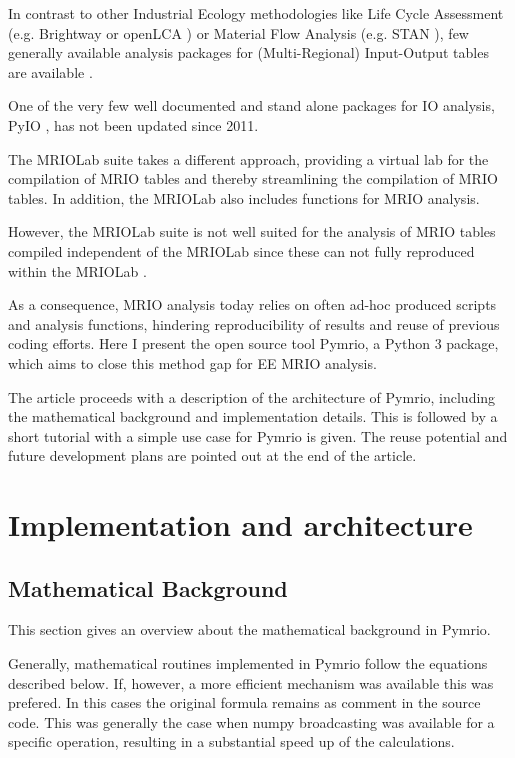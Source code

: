 \documentclass{jors}
\begin{document}
{In contrast to other Industrial Ecology methodologies like 
Life Cycle Assessment (e.g. Brightway \cite{mutel2017} or openLCA \cite{openlca2018})
or Material Flow Analysis (e.g. STAN \cite{cencic2008}), 
few generally available analysis packages for (Multi-Regional) Input-Output tables are available \cite{pauliuk2015}.  

One of the very few well documented and stand alone packages for IO analysis, PyIO \cite{nazara2003}, has not been updated since 2011.

The MRIOLab suite \cite{geschke2017,lenzen2017} takes a different approach, providing a virtual lab for the compilation of MRIO tables and thereby streamlining the compilation of MRIO tables. In addition, the MRIOLab also includes functions for MRIO analysis.

However, the MRIOLab suite is not well suited for the analysis of MRIO tables compiled independent of the MRIOLab since these can not fully reproduced within the MRIOLab \cite{rahman2017,reyes2017}.

As a consequence, MRIO analysis today relies on often ad-hoc produced scripts and analysis functions, hindering reproducibility of results and reuse of previous coding efforts.
Here I present the open source tool Pymrio, a Python 3 package, which aims to close this method gap for EE MRIO analysis.

The article proceeds with a description of the architecture of Pymrio, including the mathematical background and implementation details. This is followed by  a short tutorial with a simple use case for Pymrio is given. 
The reuse potential and future development plans are pointed out at the end of the article.


\section*{Implementation and architecture}

\subsection*{Mathematical Background}

This section gives an overview about the mathematical background in Pymrio. 

Generally, mathematical routines implemented in Pymrio follow the equations described below.
If, however, a more efficient mechanism was available this was prefered.
In this cases the original formula remains as comment in the source code.
This was generally the case when numpy broadcasting \cite{vanderwalt2011} was available for a specific operation, resulting in a substantial speed up of the calculations.

}
\end{document}
